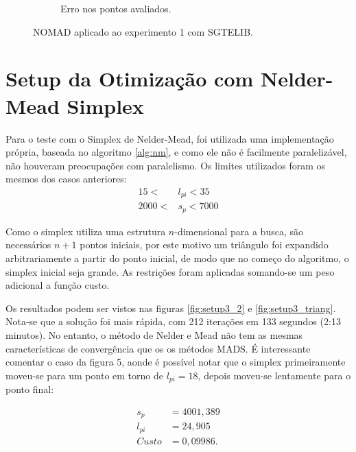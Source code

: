 \begin{figure}
\begin{subfigure}{0.5\textwidth}
  \caption{Erro nos pontos avaliados.}
  \label{fig:setup2_error}
\end{subfigure}
\caption{NOMAD aplicado ao experimento 1 com SGTELIB.}
\label{fig:setup2_2}
\end{figure}


\section{Setup da Otimização com Nelder-Mead Simplex}

Para o teste com o Simplex de Nelder-Mead, foi utilizada uma implementação própria, baseada no algoritmo \ref{alg:nm}, e como ele não é facilmente paralelizável, não houveram preocupações com paralelismo.
Os limites utilizados foram os mesmos dos casos anteriores:
\begin{align}
15 < &l_{pi} < 35 \\
2000 < &s_p < 7000
\end{align}

Como o simplex utiliza uma estrutura $n$-dimensional para a busca, são necessários $n+1$ pontos iniciais, por este motivo um triângulo foi expandido arbitrariamente a partir do ponto inicial, de modo que no começo do algoritmo, o simplex inicial seja grande. As restrições foram aplicadas somando-se um peso adicional a função custo.

Os resultados podem ser vistos nas figuras \ref{fig:setup3_2} e \ref{fig:setup3_triang}. Nota-se que a solução foi mais rápida, com 212 iterações em 133 segundos (2:13 minutos). No entanto, o método de Nelder e Mead não tem as mesmas características de convergência que os os métodos MADS. É interessante comentar o caso da figura 5, aonde é possível notar que o simplex primeiramente moveu-se para um ponto em torno de $l_{pi}=18$, depois moveu-se lentamente para o ponto final:

\begin{align*}
s_p&= 4001,389 \\
l_{pi} &= 24,905 \\
Custo &= 0,09986.
\end{align*}



